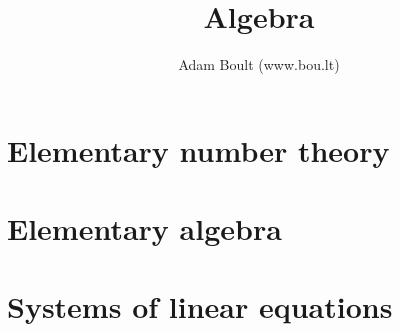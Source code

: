 \documentclass[oneside]{book}
\begin{document}
\author{Adam Boult (www.bou.lt)}
\title{Algebra}
\maketitle

\setcounter{tocdepth}{0}
\tableofcontents



\part{Elementary number theory}






\part{Elementary algebra}





\part{Systems of linear equations}


\end{document}
